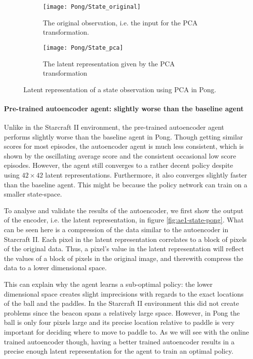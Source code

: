 \begin{figure}[h]
	\centering
	\begin{subfigure}[b]{0.3\textwidth}
		\texttt{[image: Pong/State\_original]}
		\caption{The original observation, i.e. the input for the PCA transformation.}
		\label{fig:pca-original-pong} 
	\end{subfigure}\hfill
	\begin{subfigure}[b]{0.3\textwidth}
		\texttt{[image: Pong/State\_pca]}
		\caption{The latent representation given by the PCA transformation}
		\label{fig:pca-latent-pong}
	\end{subfigure}
	\caption{Latent representation of a state observation using PCA in Pong.}
	\label{fig:pca-state-pong}
\end{figure}

\paragraph{Pre-trained autoencoder agent: slightly worse than the baseline agent}
Unlike in the Starcraft II environment, the pre-trained autoencoder agent performs slightly worse than the baseline agent in Pong. Though getting similar scores for most episodes, the autoencoder agent is much less consistent, which is shown by the oscillating average score and the consistent occasional low score episodes. However, the agent still converges to a rather decent policy despite using $42 \times 42$ latent representations. Furthermore, it also converges slightly faster than the baseline agent. This might be because the policy network can train on a smaller state-space.

To analyse and validate the results of the autoencoder, we first show the output of the encoder, i.e. the latent representation, in figure \ref{fig:ae1-state-pong}. What can be seen here is a compression of the data similar to the autoencoder in Starcraft II. Each pixel in the latent representation correlates to a block of pixels of the original data. Thus, a pixel's value in the latent representation will reflect the values of a block of pixels in the original image, and therewith compress the data to a lower dimensional space. 

This can explain why the agent learns a sub-optimal policy: the lower dimensional space creates slight imprecisions with regards to the exact locations of the ball and the paddles. In the Starcraft II environment this did not create problems since the beacon spans a relatively large space. However, in Pong the ball is only four pixels large and its precise location relative to paddle is very important for deciding where to move to paddle to. As we will see with the online trained autoencoder though, having a better trained autoencoder results in a precise enough latent representation for the agent to train an optimal policy.

